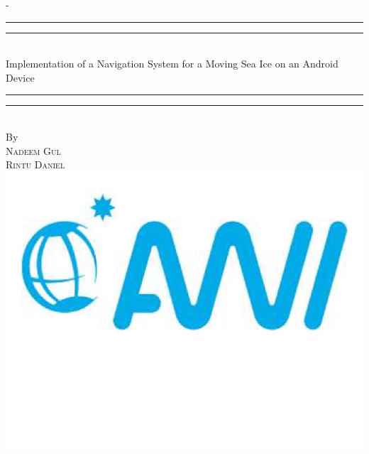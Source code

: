 %
%
% 
%
%
\begin{titlingpage}
\begin{SingleSpace}
\calccentering{\unitlength} 
\begin{adjustwidth*}{\unitlength}{-\unitlength}
\vspace*{13mm}
\begin{center}
\rule[0.5ex]{\linewidth}{2pt}\vspace*{-\baselineskip}\vspace*{3.2pt}
\rule[0.5ex]{\linewidth}{1pt}\\[\baselineskip]
{\HUGE Implementation of a Navigation System for a Moving Sea Ice on an Android Device  }\\[4mm]
\rule[0.5ex]{\linewidth}{1pt}\vspace*{-\baselineskip}\vspace{3.2pt}
\rule[0.5ex]{\linewidth}{2pt}\\
\vspace{6.5mm}
{\large By}\\
\vspace{6.5mm}
{\large\textsc{Nadeem Gul}}\\
{\large\textsc{Rintu Daniel}}\\
\vspace{11mm}
\includegraphics[scale=0.15]{logos/awi}

\end{center}
\end{adjustwidth*}
\end{SingleSpace}
\end{titlingpage}
